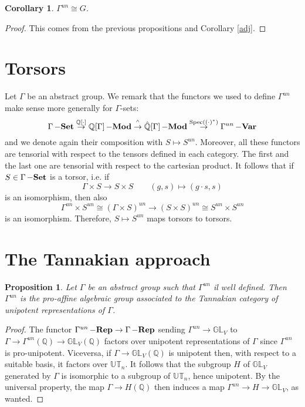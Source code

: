 \documentclass{amsart}
\newtheorem{prop}[thm]{Proposition}
\newtheorem{cor}[thm]{Corollary}
\theoremstyle{definition}
\theoremstyle{remark}
\theoremstyle{remark}
\newcommand{\Q}{\mathbb{Q}}
\newcommand{\ra}{\rightarrow}
\DeclareMathOperator{\Spec}{Spec}
\DeclareMathOperator{\Mod}{\bf{-Mod}}
\DeclareMathOperator{\Rep}{\bf{-Rep}}
\DeclareMathOperator{\lSet}{\bf{-Set}}
\DeclareMathOperator{\lVar}{\bf{-Var}}
\begin{document}
\begin{cor}
$\Gamma^{un}\cong G$.
\end{cor}

\begin{proof}
This comes from the previous propositions and Corollary \ref{adj}.
\end{proof}

\section{Torsors}

Let $\Gamma$ be an abstract group. We remark that the functors we used to define $\Gamma^{un}$ make sense more generally for $\Gamma$-sets:
\[
\Gamma\lSet\stackrel{\Q[\cdot]}{\rightarrow}\Q[\Gamma]\Mod\stackrel{^\wedge}{\rightarrow}\hat{\Q}[\Gamma]\Mod\stackrel{\Spec((\cdot)^*)}{\rightarrow}\Gamma^{un}\lVar
\]
and we denote again their composition with $S\mapsto S^{un}$.
Moreover, all these functors are tensorial with respect to the tensors defined in each category. The first and the last one are tensorial with respect to the cartesian product. It follows that if $S\in\Gamma\lSet$ is a torsor, i.e. if 
\[\Gamma\times S\ra S\times S\qquad (g,s)\mapsto (g\cdot s,s)\]
is an isomorphism, then also
\[\Gamma^{un}\times S^{un}\cong(\Gamma\times S)^{un}\ra (S\times S)^{un}\cong S^{un}\times S^{un}\]
is an isomorphism. Therefore, $S\mapsto S^{un}$ maps torsors to torsors.


\section{The Tannakian approach}

\begin{prop}
Let $\Gamma$ be an abstract group such that $\Gamma^{un}$ il well defined. Then $\Gamma^{un}$ is the pro-affine algebraic group associated to the Tannakian category of unipotent representations of $\Gamma$.
\end{prop}

\begin{proof}
The functor $\Gamma^{un}\Rep\ra\Gamma \Rep$ sending $\Gamma^{un}\ra\mathbb{GL}_V$ to $\Gamma\ra\Gamma^{un}(\Q)\ra\mathbb{GL}_V(\Q)$ factors over unipotent representations of $\Gamma$ since $\Gamma^{un}$ is pro-unipotent. Viceversa, if $\Gamma\ra\mathbb{GL}_V(\Q)$ is unipotent then, with respect to a suitable basis, it factors over $\mathbb{UT}_n$. It follows that the subgroup $H$ of $\mathbb{GL}_V$ generated by $\Gamma$ is isomorphic to a subgroup of $\mathbb{UT}_n$, hence unipotent. By the universal property, the map $\Gamma\ra H(\Q)$ then induces a map $\Gamma^{un}\ra H\ra\mathbb{GL}_V$, as wanted.
\end{proof}
\end{document}
